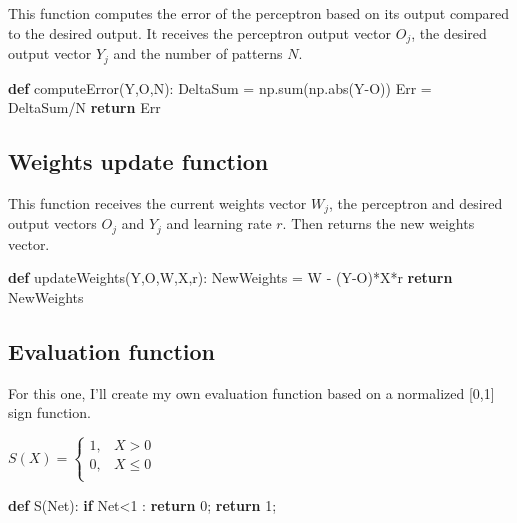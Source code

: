 \documentclass[
]{IEEEtran}
\newenvironment{Shaded}{\begin{snugshade}}{\end{snugshade}}
\newcommand{\BuiltInTok}[1]{\textcolor[rgb]{0.00,0.23,0.31}{#1}}
\newcommand{\ControlFlowTok}[1]{\textcolor[rgb]{0.00,0.23,0.31}{\textbf{#1}}}
\newcommand{\DecValTok}[1]{\textcolor[rgb]{0.68,0.00,0.00}{#1}}
\newcommand{\KeywordTok}[1]{\textcolor[rgb]{0.00,0.23,0.31}{\textbf{#1}}}
\newcommand{\NormalTok}[1]{\textcolor[rgb]{0.00,0.23,0.31}{#1}}
\newcommand{\OperatorTok}[1]{\textcolor[rgb]{0.37,0.37,0.37}{#1}}
\begin{document}
This function computes the error of the perceptron based on its output
compared to the desired output. It receives the perceptron output vector
\(O_j\), the desired output vector \(Y_j\) and the number of patterns
\(N\).

\begin{Shaded}
\begin{Highlighting}[]
\KeywordTok{def}\NormalTok{ computeError(Y,O,N):}
\NormalTok{  DeltaSum }\OperatorTok{=}\NormalTok{ np.}\BuiltInTok{sum}\NormalTok{(np.}\BuiltInTok{abs}\NormalTok{(Y}\OperatorTok{{-}}\NormalTok{O))}
\NormalTok{  Err }\OperatorTok{=}\NormalTok{ DeltaSum}\OperatorTok{/}\NormalTok{N}
  \ControlFlowTok{return}\NormalTok{ Err}
\end{Highlighting}
\end{Shaded}

\subsection{Weights update function}\label{weights-update-function}

This function receives the current weights vector \(W_j\), the
perceptron and desired output vectors \(O_j\) and \(Y_j\) and learning
rate \(r\). Then returns the new weights vector.

\begin{Shaded}
\begin{Highlighting}[]
\KeywordTok{def}\NormalTok{ updateWeights(Y,O,W,X,r):}
\NormalTok{  NewWeights }\OperatorTok{=}\NormalTok{ W }\OperatorTok{{-}}\NormalTok{ (Y}\OperatorTok{{-}}\NormalTok{O)}\OperatorTok{*}\NormalTok{X}\OperatorTok{*}\NormalTok{r}
  \ControlFlowTok{return}\NormalTok{  NewWeights}
\end{Highlighting}
\end{Shaded}

\subsection{Evaluation function}\label{evaluation-function}

For this one, I'll create my own evaluation function based on a
normalized {[}0,1{]} sign function.

\(S(X) = \begin{cases}
  1, &X >     0\\
  0, &X \leq  0\\
\end{cases}\)

\begin{Shaded}
\begin{Highlighting}[]
\KeywordTok{def}\NormalTok{ S(Net):}
  \ControlFlowTok{if}\NormalTok{ Net}\OperatorTok{\textless{}}\DecValTok{1}\NormalTok{ :}
    \ControlFlowTok{return} \DecValTok{0}\OperatorTok{;}
  \ControlFlowTok{return} \DecValTok{1}\OperatorTok{;}
\end{Highlighting}
\end{Shaded}
\end{document}
